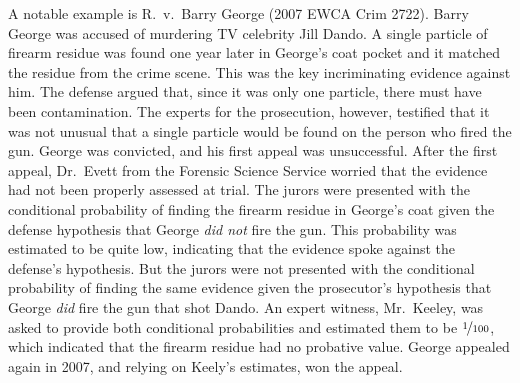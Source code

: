 \documentclass{article}
\newcommand{\pr}{\mathsf{Pr}}
\begin{document}

 
 A notable example is R.\ v.\ Barry 
George (2007 EWCA Crim 2722). Barry George was accused of murdering TV celebrity Jill Dando. 
%
	A single particle of firearm  residue %
	 was found one year later in George's coat pocket and it matched the residue from the crime scene.
	 This was the key incriminating evidence against him. 
%
The defense argued that, since it was only one particle, there must have been contamination. The experts for the prosecution, however, testified that it was not unusual that a single particle would be found on the person who fired the gun. George was convicted, and his first appeal was unsuccessful. 
%
After the first appeal, Dr.\ Evett from the Forensic Science Service worried that the evidence had not been properly assessed at trial. The jurors  were presented with the conditional probability 
of finding the  firearm residue in George's coat given the defense hypothesis %
that George \textit{did not} fire the gun. This probability was estimated to be quite low, indicating that the evidence spoke against the defense's hypothesis. But the jurors were not presented with the conditional probability 
of finding the same evidence given the prosecutor's hypothesis 
that George \textit{did} fire the gun that shot Dando.
%
%
\noindent 
An expert witness, Mr.\ Keeley, was asked to provide both conditional probabilities and estimated them to be $\nicefrac{1}{100}$, which indicated that the firearm residue had no probative value. 
George appealed again in 2007, and relying on Keely's estimates, won the appeal.
%
\end{document}
